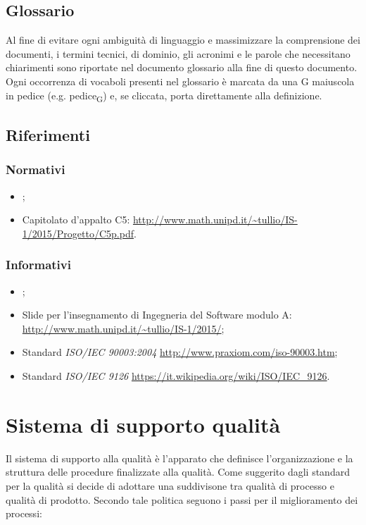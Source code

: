 \documentclass[12pt,a4paper]{article}
\begin{document}
\subsection{Glossario}
Al fine di evitare ogni ambiguità di linguaggio e massimizzare la comprensione dei documenti, i termini tecnici, di dominio, gli acronimi e le parole che necessitano chiarimenti sono riportate nel documento glossario alla fine di questo documento. Ogni occorrenza di vocaboli presenti nel glossario è marcata da una G maiuscola in pedice (e.g. pedice\textsubscript{G}) e, se cliccata, porta direttamente alla definizione.

\subsection{Riferimenti}

\subsubsection{Normativi}
\begin{itemize}
	\item \NdP;
    \item Capitolato d'appalto C5: \url{http://www.math.unipd.it/~tullio/IS-1/2015/Progetto/C5p.pdf}.
\end{itemize}

\subsubsection{Informativi}
\begin{itemize}
	\item \PdP;
    \item Slide per l'insegnamento di Ingegneria del Software modulo A: \url{http://www.math.unipd.it/~tullio/IS-1/2015/};
	\item Standard \textit{ISO/IEC 90003:2004} \url{http://www.praxiom.com/iso-90003.htm};
	\item Standard \textit{ISO/IEC 9126} \url{https://it.wikipedia.org/wiki/ISO/IEC_9126}.
\end{itemize}
\newpage
\section{Sistema di supporto qualità}
Il sistema di supporto alla qualità è l'apparato che definisce l'organizzazione e la struttura delle procedure finalizzate alla qualità. Come suggerito dagli standard per la qualità si decide di adottare una suddivisone tra qualità di processo e qualità di prodotto. Secondo tale politica seguono i passi per il miglioramento dei processi: 
\end{document}
